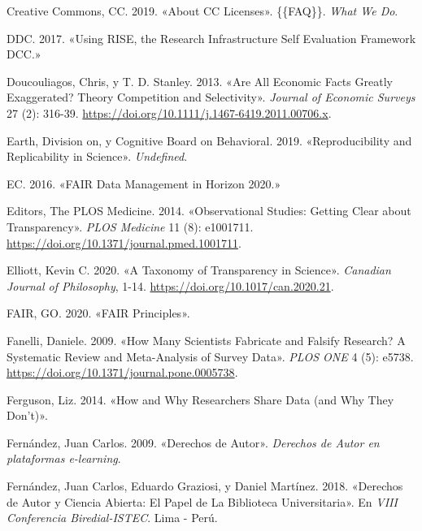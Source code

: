\documentclass[
  spanish,
  a4paper,
  oneside]{scrbook}
\newlength{\cslhangindent}
\newenvironment{CSLReferences}[2] %
 {\begin{list}{}{%
  \setlength{\itemindent}{0pt}
  \setlength{\leftmargin}{0pt}
  \setlength{\parsep}{0pt}
  \ifodd #1
   \setlength{\leftmargin}{\cslhangindent}
   \setlength{\itemindent}{-1\cslhangindent}
  \fi
  \setlength{\itemsep}{#2\baselineskip}}}
 {\end{list}}
\begin{document}
\begin{CSLReferences}{1}{0}
Creative Commons, CC. 2019. {«About {CC Licenses}»}. \{\{FAQ\}\}.
\emph{What We Do}.

DDC. 2017. {«Using {RISE}, the {Research Infrastructure Self Evaluation
Framework} {\textbar} {DCC}.»}

Doucouliagos, Chris, y T. D. Stanley. 2013. {«Are {All Economic Facts
Greatly Exaggerated}? {Theory Competition} and {Selectivity}»}.
\emph{Journal of Economic Surveys} 27 (2): 316-39.
\url{https://doi.org/10.1111/j.1467-6419.2011.00706.x}.

Earth, Division on, y Cognitive Board on Behavioral. 2019.
{«Reproducibility and {Replicability} in {Science}»}. \emph{Undefined}.

EC. 2016. {«{FAIR Data Management} in {Horizon} 2020.»}

Editors, The PLOS Medicine. 2014. {«Observational {Studies}: {Getting
Clear} about {Transparency}»}. \emph{PLOS Medicine} 11 (8): e1001711.
\url{https://doi.org/10.1371/journal.pmed.1001711}.

Elliott, Kevin C. 2020. {«A {Taxonomy} of {Transparency} in {Science}»}.
\emph{Canadian Journal of Philosophy}, 1-14.
\url{https://doi.org/10.1017/can.2020.21}.

FAIR, GO. 2020. {«{FAIR Principles}»}.

Fanelli, Daniele. 2009. {«How {Many Scientists Fabricate} and {Falsify
Research}? {A Systematic Review} and {Meta-Analysis} of {Survey Data}»}.
\emph{PLOS ONE} 4 (5): e5738.
\url{https://doi.org/10.1371/journal.pone.0005738}.

Ferguson, Liz. 2014. {«How and {Why Researchers Share Data} (and {Why
They Don}'t)»}.

Fernández, Juan Carlos. 2009. {«Derechos de {Autor}»}. \emph{Derechos de
Autor en plataformas e-learning}.

Fernández, Juan Carlos, Eduardo Graziosi, y Daniel Martínez. 2018.
{«Derechos de Autor y Ciencia Abierta: El Papel de La Biblioteca
Universitaria»}. En \emph{{VIII Conferencia Biredial-ISTEC}}. Lima -
Per{ú}.


\end{CSLReferences}
\end{document}
